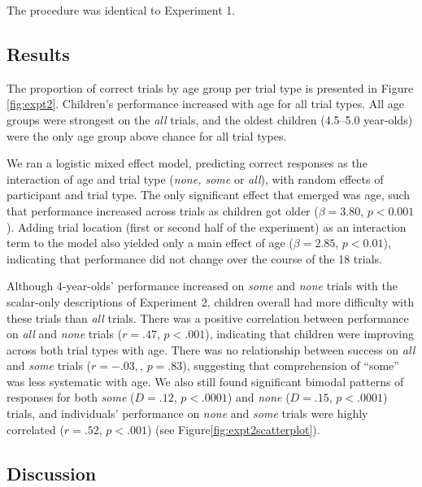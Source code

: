 \documentclass[10pt,letterpaper]{article}
\begin{document}
The procedure was identical to Experiment 1. 

\subsection{Results}

The proportion of correct trials by age group per trial type is presented in Figure \ref{fig:expt2}.  Children's performance increased with age for all trial types. All age groups were strongest on the \emph{all} trials, and the oldest children (4.5--5.0 year-olds) were the only age group above chance for all trial types.  

We ran a logistic mixed effect model, predicting correct responses as the interaction of age and trial type (\emph{none, some} or \emph{all}), with random effects of participant and trial type. The only significant effect that emerged was age, such that performance increased across trials as children got older ($\beta = 3.80$, $p < 0.001$). Adding trial location (first or second half of the experiment) as an interaction term to the model also yielded only a main effect of age ($\beta = 2.85$, $p < 0.01$), indicating that performance did not change over the course of the 18 trials.

Although 4-year-olds' performance increased on \emph{some} and \emph{none} trials with the scalar-only descriptions of Experiment 2, children overall had more difficulty with these trials than \emph{all} trials. There was a positive correlation between performance on \emph{all} and \emph{none} trials ($r=.47$, $p<.001$), indicating that children were  improving across both trial types with age.  There was no relationship between success on \emph{all} and \emph{some} trials ($r=-.03,$, $p=.83$), suggesting that comprehension of ``some'' was less systematic with age. We also still found significant bimodal patterns of responses for both \emph{some} ($D=.12$, $p<.0001$) and \emph{none} ($D=.15$, $p<.0001$) trials, and individuals' performance on \emph{none} and \emph{some} trials were highly correlated ($r=.52$, $p<.001$) (see Figure\ref{fig:expt2scatterplot}). 

\subsection{Discussion}
\end{document}
